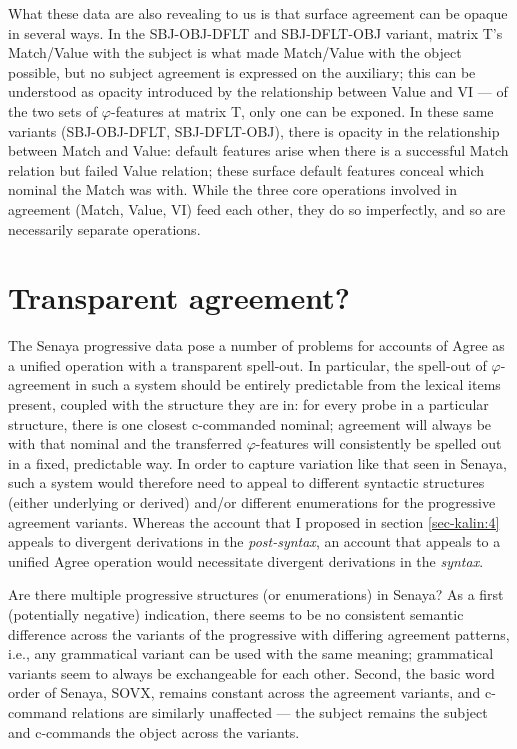 \documentclass[output=paper
,modfonts
,nonflat]{langsci/langscibook}
\begin{document}
What these data are also revealing to us is that surface agreement can be opaque in several ways. In the SBJ-OBJ-DFLT  and SBJ-DFLT-OBJ variant, matrix T's Match/Value with the subject is what made Match/Value with the object possible, but no subject agreement is expressed on the auxiliary; this can be understood as opacity introduced by the relationship between Value and VI --- of the two sets of $\varphi$-features at matrix T, only one can be exponed. In these same variants (SBJ-OBJ-DFLT, SBJ-DFLT-OBJ), there is opacity in the relationship between Match and Value: default features arise when there is a successful Match relation but failed Value relation; these surface default features conceal which nominal the Match was with. While the three core operations involved in agreement (Match, Value, VI) feed each other, they do so imperfectly, and so are necessarily separate operations.

\section{Transparent agreement?} \label{sec-kalin:5}

The Senaya progressive data pose a number of problems for accounts of Agree as a unified operation with a transparent spell-out. In particular, the spell-out of $\varphi$-agreement in such a system should be entirely predictable from the lexical items present, coupled with the structure they are in: for every probe in a particular structure, there is one closest c-commanded nominal; agreement will always be with that nominal and the transferred $\varphi$-features will consistently be spelled out in a fixed, predictable way. In order to capture variation like that seen in Senaya, such a system would therefore need to appeal to different syntactic structures (either underlying or derived) and/or different enumerations for the progressive agreement variants. Whereas the account that I proposed in section \ref{sec-kalin:4} appeals to divergent derivations in the \textit{post-syntax}, an account that appeals to a unified Agree operation would necessitate divergent derivations in the \textit{syntax}.

Are there multiple progressive structures (or enumerations) in Senaya? As a first (potentially negative) indication, there seems to be no consistent semantic difference  across the variants of the progressive with differing agreement patterns, i.e., any grammatical variant can be used with the same meaning; grammatical variants seem to always be exchangeable for each other. Second, the basic word order of Senaya, SOVX, remains constant across the agreement variants, and c-command relations are similarly unaffected --- the subject remains the subject and c-commands the object across the variants.
\end{document}
